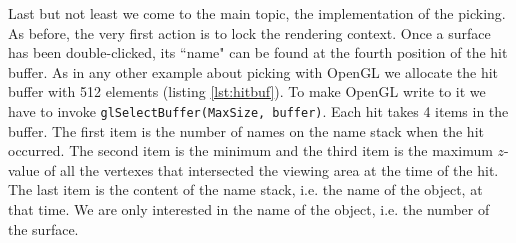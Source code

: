 \documentclass[jou,noapacite]{apa}
\begin{document}
Last but not least we come to the main topic, the implementation of the picking.
%
As before, the very first action is to lock the rendering context.
%
Once a surface has been double-clicked, its ``name" can be found at the fourth
position of the hit buffer.
%
As in any other example about picking with OpenGL we allocate the hit buffer
with 512 elements (listing \ref{lst:hitbuf}).
%
To make OpenGL write to it we have to invoke \lstinline|glSelectBuffer(MaxSize, buffer)|.
Each hit takes 4 items in the buffer.
%
The first item is the number of names on the name stack when the hit occurred.
%
The second item is the minimum and the third item is the maximum $z$-value of
all the vertexes that intersected the viewing area at the time of the hit.
%
The last item is the content of the name stack, i.e. the name of the object,
at that time.
%
We are only interested in the name of the object, i.e. the number of the
surface.
\end{document}
